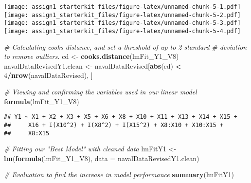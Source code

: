 \documentclass[
]{article}
\newenvironment{Shaded}{\begin{snugshade}}{\end{snugshade}}
\newcommand{\CommentTok}[1]{\textcolor[rgb]{0.56,0.35,0.01}{\textit{#1}}}
\newcommand{\DataTypeTok}[1]{\textcolor[rgb]{0.13,0.29,0.53}{#1}}
\newcommand{\DecValTok}[1]{\textcolor[rgb]{0.00,0.00,0.81}{#1}}
\newcommand{\KeywordTok}[1]{\textcolor[rgb]{0.13,0.29,0.53}{\textbf{#1}}}
\newcommand{\NormalTok}[1]{#1}
\newcommand{\OperatorTok}[1]{\textcolor[rgb]{0.81,0.36,0.00}{\textbf{#1}}}
\newcommand{\StringTok}[1]{\textcolor[rgb]{0.31,0.60,0.02}{#1}}
\begin{document}
\texttt{[image: assign1\_starterkit\_files/figure-latex/unnamed-chunk-5-1.pdf]}
\texttt{[image: assign1\_starterkit\_files/figure-latex/unnamed-chunk-5-2.pdf]}
\texttt{[image: assign1\_starterkit\_files/figure-latex/unnamed-chunk-5-3.pdf]}
\texttt{[image: assign1\_starterkit\_files/figure-latex/unnamed-chunk-5-4.pdf]}

\begin{Shaded}
\begin{Highlighting}[]
\CommentTok{# Calculating cooks distance, and set a threshold of up to 2 standard}
\CommentTok{# deviation to remove outliers.}
\NormalTok{cd <-}\StringTok{ }\KeywordTok{cooks.distance}\NormalTok{(lmFit_Y1_V8)}
\NormalTok{navalDataRevisedY1.clean <-}\StringTok{ }\NormalTok{navalDataRevised[}\KeywordTok{abs}\NormalTok{(cd) }\OperatorTok{<}\StringTok{ }\DecValTok{4}\OperatorTok{/}\KeywordTok{nrow}\NormalTok{(navalDataRevised), ]}

\CommentTok{# Viewing and confirming the variables used in our linear model}
\KeywordTok{formula}\NormalTok{(lmFit_Y1_V8)}
\end{Highlighting}
\end{Shaded}

\begin{verbatim}
## Y1 ~ X1 + X2 + X3 + X5 + X6 + X8 + X10 + X11 + X13 + X14 + X15 + 
##     X16 + I(X10^2) + I(X8^2) + I(X15^2) + X8:X10 + X10:X15 + 
##     X8:X15
\end{verbatim}

\begin{Shaded}
\begin{Highlighting}[]
\CommentTok{# Fitting our "Best Model" with cleaned data}
\NormalTok{lmFitY1 <-}\StringTok{ }\KeywordTok{lm}\NormalTok{(}\KeywordTok{formula}\NormalTok{(lmFit_Y1_V8), }\DataTypeTok{data =}\NormalTok{ navalDataRevisedY1.clean)}

\CommentTok{# Evaluation to find the increase in model performance}
\KeywordTok{summary}\NormalTok{(lmFitY1)}
\end{Highlighting}
\end{Shaded}
\end{document}
